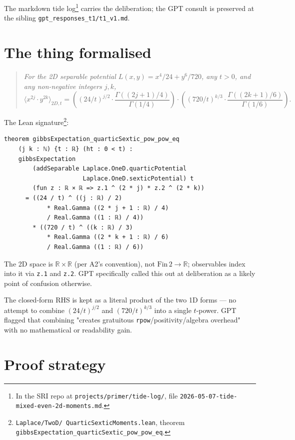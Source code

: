 \documentclass[11pt]{article}
\begin{document}
The markdown tide log\footnote{In the SRI repo at
\texttt{projects/primer/tide-log/}, file
\texttt{2026-05-07-tide-mixed-even-2d-moments.md}.} carries the
deliberation; the GPT consult is preserved at the sibling
\texttt{gpt\_responses\_t1/t1\_v1.md}.

\section{The thing formalised}

\begin{quote}\itshape
For the 2D separable potential $L(x, y) = x^4/24 + y^6/720$, any
$t > 0$, and any non-negative integers $j, k$,
$$
  \langle x^{2j} \cdot y^{2k} \rangle_{2D, t}
  = \left( (24/t)^{j/2} \cdot \frac{\Gamma((2j+1)/4)}{\Gamma(1/4)} \right)
    \cdot \left( (720/t)^{k/3} \cdot \frac{\Gamma((2k+1)/6)}{\Gamma(1/6)} \right).
$$
\end{quote}

\noindent The Lean signature\footnote{\texttt{Laplace/TwoD/%
QuarticSexticMoments.lean}, theorem
\texttt{gibbsExpectation\_quarticSextic\_pow\_pow\_eq}.}:

\begin{verbatim}
theorem gibbsExpectation_quarticSextic_pow_pow_eq
    (j k : ℕ) {t : ℝ} (ht : 0 < t) :
    gibbsExpectation
        (addSeparable Laplace.OneD.quarticPotential
                      Laplace.OneD.sexticPotential) t
        (fun z : ℝ × ℝ => z.1 ^ (2 * j) * z.2 ^ (2 * k))
      = ((24 / t) ^ ((j : ℝ) / 2)
            * Real.Gamma ((2 * j + 1 : ℝ) / 4)
            / Real.Gamma ((1 : ℝ) / 4))
        * ((720 / t) ^ ((k : ℝ) / 3)
            * Real.Gamma ((2 * k + 1 : ℝ) / 6)
            / Real.Gamma ((1 : ℝ) / 6))
\end{verbatim}

\noindent The 2D space is $\mathbb{R} \times \mathbb{R}$ (per A2's
convention), not $\mathrm{Fin}\,2 \to \mathbb R$; observables index
into it via \texttt{z.1} and \texttt{z.2}. GPT specifically called
this out at deliberation as a likely point of confusion otherwise.

The closed-form RHS is kept as a literal product of the two 1D
forms — no attempt to combine $(24/t)^{j/2}$ and $(720/t)^{k/3}$
into a single $t$-power. GPT flagged that combining "creates
gratuitous \texttt{rpow}/positivity/algebra overhead" with no
mathematical or readability gain.

\section{Proof strategy}
\end{document}
